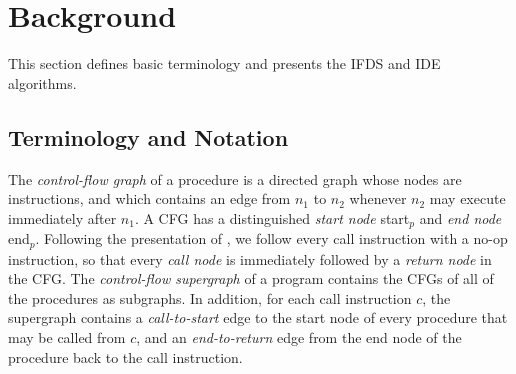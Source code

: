 \section{Background}\label{sec:bg}
This section defines basic terminology and presents the IFDS and IDE algorithms.

\subsection{Terminology and Notation}
The \textit{control-flow graph} of a procedure is a directed graph whose nodes are instructions, and which contains an edge from $n_1$ to $n_2$ whenever
$n_2$ may execute immediately after $n_1$. A CFG has a distinguished \textit{start node} \textsf{start}$_p$ and \textit{end node} \textsf{end}$_p$.
Following the presentation of \cite{reps1995precise,sagiv1996precise}, we follow every
call instruction with a no-op instruction, so that every \textit{call node} is immediately
followed by a \textit{return node} in the CFG.
The \textit{control-flow supergraph} of a program contains the CFGs of all of the procedures as
subgraphs. In addition, for each call instruction $c$, the supergraph contains a \textit{call-to-start} edge to the start node of every procedure that
may be called from $c$, and an \textit{end-to-return} edge from the end node of the procedure back to the call instruction.

